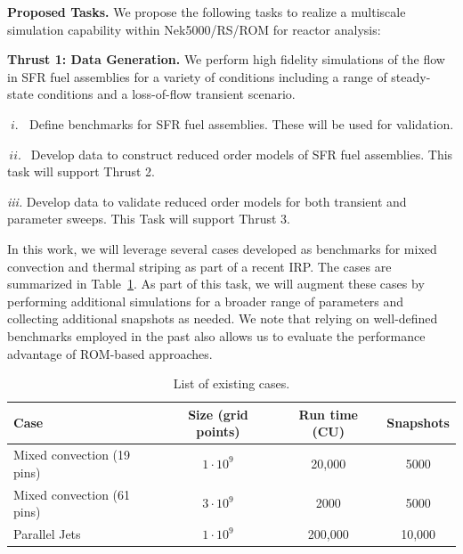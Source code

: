 \noindent

\vspace{-.1in}
{\bf Proposed Tasks.}
We propose the following tasks to realize a multiscale simulation
capability within Nek5000/RS/ROM for reactor analysis:

\textbf{Thrust 1: Data Generation.} We perform high fidelity simulations of the
flow in SFR fuel assemblies for a variety of conditions including a range of
steady-state conditions and a loss-of-flow transient scenario.
\\[-4ex]
\begin{description}
\item{$\; i.\; \;$}
Define benchmarks for SFR fuel assemblies. These will be used for validation.
\\[-4ex]
\item{$\, ii. \,\;$}
Develop data to construct reduced order models of SFR fuel assemblies. This
task will support Thrust 2.
\\[-4ex]
\item{\em iii.} Develop data to validate reduced order models for both
transient and parameter sweeps. This Task will support Thrust 3.
\\[-4ex]
\end{description}

In this work, we will leverage several cases developed as benchmarks for mixed convection and thermal striping as part of a recent IRP. The cases are summarized in Table~\ref{tab:cases}. As part of this task, we will augment these cases by performing additional simulations for a broader range of parameters and collecting additional snapshots as needed. We note that relying on well-defined benchmarks employed in the past also allows us to evaluate the performance advantage of ROM-based approaches.

\begin{table}
\centering
\begin{tabular}{|l|c|c|c|}
\hline
\textbf{Case} & \textbf{Size} (grid points) & \textbf{Run time} (CU) & \textbf{Snapshots} \\\hline
Mixed convection (19 pins) \cite{kraus22}& $1\cdot 10^{9}$ & 20,000 & 5000 \\
\hline
Mixed convection (61 pins) \cite{kraus22}& $3\cdot 10^{9}$ & 2000 &  5000 \\
\hline
Parallel Jets \cite{acierno22}& $1\cdot 10^{9}$ & 200,000 & 10,000 \\
\hline
\end{tabular}
\caption{\label{tab:cases} List of existing cases.}
\end{table}

